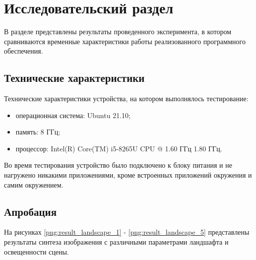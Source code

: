 \chapter{Исследовательский раздел}
В разделе представлены результаты проведенного эксперимента, в котором сравниваются временные характеристики работы реализованного программного обеспечения.
 
\section{Технические характеристики}
Технические характеристики устройства, на котором выполнялось тестирование:
\begin{itemize}
	\item операционная система: Ubuntu 21.10;
	\item память: 8 ГГц;
	\item процессор: Intel(R) Core(TM) i5-8265U CPU @ 1.60 ГГц   1.80 ГГц.
\end{itemize}

Во время тестирования устройство было подключено к блоку питания и не нагружено никакими приложениями, кроме встроенных приложений окружения и самим окружением.

\section{Апробация}
На рисунках \ref{png:result_landscape_1} - \ref{png:result_landscape_5} представлены результаты синтеза изображения с различными параметрами ландшафта и освещенности сцены.
\begin{figure}[H]
\end{figure}

\begin{figure}[H]
\end{figure}

\begin{figure}[H]
\end{figure}

